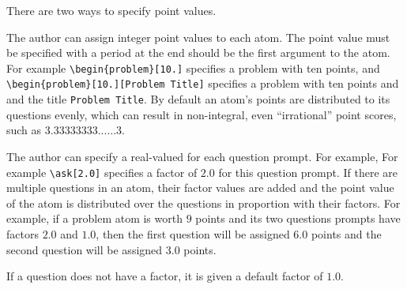 \begin{cluster}
\label{grp:grm:quiz::ways}

\begin{gram}
\label{grm:quiz::ways}
There are two ways to specify point values.

\end{gram}
\end{cluster}

\begin{cluster}
\label{grp:grm:quiz::point-values}

\begin{gram}
\label{grm:quiz::point-values}
The author can assign integer point values to each atom. The point value must be specified with a period at the end should be the first argument to the atom.
For example \lstinline`\begin{problem}[10.]` specifies a  problem with ten points, and
\lstinline`\begin{problem}[10.][Problem Title]` specifies a  problem with ten points and and the title
\lstinline`Problem Title`.
By default an atom's points are distributed to its questions evenly,
which can result in non-integral, even ``irrational'' point scores, such as $3.33333333...\ldots 3$. 

\end{gram}
\end{cluster}

\begin{cluster}
\label{grp:grm:quiz::question-factors}

\begin{gram}
\label{grm:quiz::question-factors}
The author can specify a real-valued  for each question prompt.  For
example, For example \lstinline`\ask[2.0]` specifies a factor of $2.0$
for this question prompt. If there are multiple questions in an atom,
their factor values are added and the point value of the atom is
distributed over the questions in proportion with their factors.  For
example, if a problem atom is worth $9$ points and its two questions
prompts have factors $2.0$ and $1.0$, then the first question will be
assigned $6.0$ points and the second question will be assigned $3.0$
points.

If a question does not have a factor, it is given a default factor of $1.0$. 

\end{gram}
\end{cluster}

